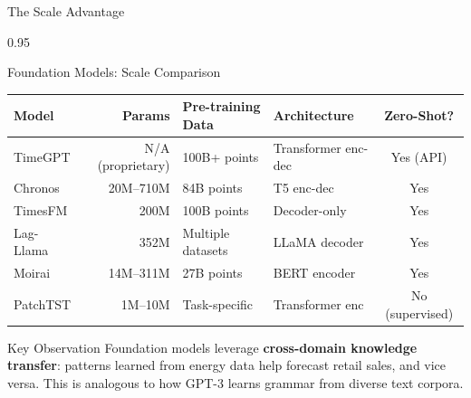 \documentclass[9pt, aspectratio=169, t]{beamer}
\begin{document}
\begin{frame}{The Scale Advantage}
    \begin{cminipage}{0.95\textwidth}
    \vspace{-2mm}
    {\footnotesize
    \begin{block}{Foundation Models: Scale Comparison}
    \vspace{-2mm}
    \begin{center}
    \begin{tabular}{l|r|l|l|c}
        \toprule
        \textbf{Model} & \textbf{Params} & \textbf{Pre-training Data} & \textbf{Architecture} & \textbf{Zero-Shot?} \\
        \midrule
        TimeGPT & N/A (proprietary) & 100B+ points & Transformer enc-dec & Yes (API) \\
        Chronos & 20M--710M & 84B points & T5 enc-dec & Yes \\
        TimesFM & 200M & 100B points & Decoder-only & Yes \\
        Lag-Llama & 352M & Multiple datasets & LLaMA decoder & Yes \\
        Moirai & 14M--311M & 27B points & BERT encoder & Yes \\
        PatchTST & 1M--10M & Task-specific & Transformer enc & No (supervised) \\
        \bottomrule
    \end{tabular}
    \end{center}
    \vspace{-2mm}
    \end{block}
    }
    \vspace{-2mm}
    \begin{exampleblock}{Key Observation}
        {\small Foundation models leverage \textbf{cross-domain knowledge transfer}: patterns learned from energy data help forecast retail sales, and vice versa. This is analogous to how GPT-3 learns grammar from diverse text corpora.}
    \end{exampleblock}
    \end{cminipage}
\end{frame}
\end{document}
